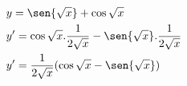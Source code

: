 \begin{ex}
\begin{align}
&y=\sen{\sqrt{x}}+\cos{\sqrt{x}}\nonumber\\
&y'=\cos{\sqrt{x}}.\frac{1}{2\sqrt{x}}-\sen{\sqrt{x}}.\frac{1}{2\sqrt{x}}\nonumber\\
&y'=\frac{1}{2\sqrt{x}}(\cos{\sqrt{x}}-\sen{\sqrt{x}})\nonumber
\end{align}
\end{ex}
